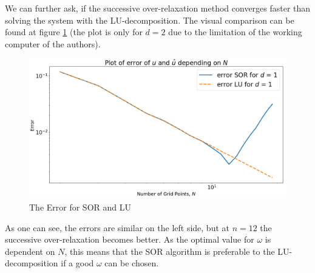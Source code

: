 We can further ask, if the successive over-relaxation method converges faster than solving the system with the LU-decomposition. The visual comparison can be found at figure \ref{fig:boat2} (the plot is only for \(d = 2\) due to the limitation of the working computer of the authors).

\begin{figure}[h]
	\includegraphics[width=\linewidth]{graphics/plot_error_both.png}
	\caption{The Error for SOR and LU}
	\label{fig:boat2}
\end{figure}

As one can see, the errors are similar on the left side, but at \(n = 12\) the successive over-relaxation becomes better. As the optimal value for \(\omega\) is dependent on \(N\), this means that the SOR algorithm is preferable to the LU-decomposition if a good \(\omega\) can be chosen.